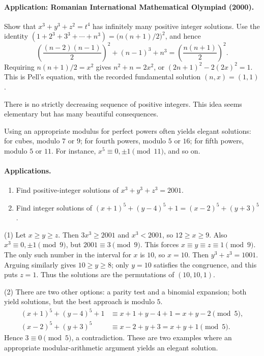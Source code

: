 \documentclass[11pt,a4paper]{article}
\begin{document}
\paragraph{Application: Romanian International Mathematical Olympiad (2000).}
Show that $x^3+y^3+z^2=t^4$ has infinitely many positive integer solutions.
Use the identity
$(1+2^3+3^3+\cdots+n^3)=\bigl(n(n+1)/2\bigr)^2$, and hence
\[
\left(\frac{(n-2)(n-1)}2\right)^2+(n-1)^3+n^3
=\left(\frac{n(n+1)}2\right)^2.
\]
Requiring $n(n+1)/2=x^2$ gives
$n^2+n=2x^2$, or $(2n+1)^2-2(2x)^2=1$.
This is Pell's equation, with the recorded fundamental solution $(n,x)=(1,1)$.

\setcounter{theorem}{18}\begin{lemma}
There is no strictly decreasing sequence of positive integers.
This idea seems elementary but has many beautiful consequences.
\end{lemma}

\setcounter{theorem}{19}\begin{lemma}
Using an appropriate modulus for perfect powers often yields elegant solutions:
for cubes, modulo $7$ or $9$; for fourth powers, modulo $5$ or $16$;
for fifth powers, modulo $5$ or $11$. For instance, $x^5\equiv0,\pm1\pmod{11}$, and so on.
\end{lemma}
\paragraph{Applications.}
\begin{enumerate}
\setcounter{enumi}{0}\item Find positive-integer solutions of $x^3+y^3+z^3=2001$.
\setcounter{enumi}{1}\item Find integer solutions of $(x+1)^5+(y-4)^5+1=(x-2)^5+(y+3)^5$.
\end{enumerate}
(1) Let $x\geq y\geq z$. Then $3x^3\geq2001$ and $x^3<2001$, so
$12\geq x\geq9$.
Also $x^3\equiv0,\pm1\pmod9$, but $2001\equiv3\pmod9$.
This forces $x\equiv y\equiv z\equiv1\pmod9$.
The only such number in the interval for $x$ is $10$, so $x=10$.
Then $y^3+z^3=1001$. Arguing similarly gives $10\geq y\geq8$;
only $y=10$ satisfies the congruence, and this puts $z=1$.
Thus the solutions are the permutations of $(10,10,1)$.

(2) There are two other options: a parity test and a binomial expansion; both yield solutions,
but the best approach is modulo $5$.
\begin{align*}
(x+1)^5+(y-4)^5+1&\equiv x+1+y-4+1=x+y-2\pmod5,\\
(x-2)^5+(y+3)^5&\equiv x-2+y+3=x+y+1\pmod5.
\end{align*}
Hence $3\equiv0\pmod5$, a contradiction.
These are two examples where an appropriate modular-arithmetic argument yields an elegant solution.
\end{document}
